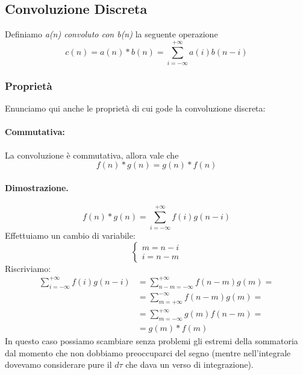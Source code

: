 \subsection{Convoluzione Discreta}
Definiamo \textit{a(n) convoluto con b(n)} la seguente operazione 
\begin{equation}
    c(n) = a(n) \ast b(n) = \sum_{i = -\infty}^{+\infty} a(i)b(n - i)
\end{equation}

\subsubsection{Proprietà}
Enunciamo qui anche le proprietà di cui gode la convoluzione discreta:
\paragraph{Commutativa:} La convoluzione è commutativa, allora vale che
    \begin{equation*}
        f(n) \ast g(n) = g(n) \ast f(n)
    \end{equation*}
    \paragraph{Dimostrazione.}
    \begin{equation*}
        f(n) \ast g(n) = \sum_{i = -\infty}^{+\infty} f(i)g(n - i) 
    \end{equation*}
    Effettuiamo un cambio di variabile: 
    \begin{equation*}
        \begin{cases}
            m = n - i\\
            i = n - m
        \end{cases}
    \end{equation*}
    Riscriviamo:
    \begin{align*}
        \sum_{i = -\infty}^{+\infty} f(i)g(n - i) &= \sum_{n - m = -\infty}^{+\infty} f(n - m)g(m) = \\
                                                  &= \sum_{m = +\infty}^{-\infty} f(n - m)g(m)= \\
                                                  &= \sum_{m = -\infty}^{+\infty} g(m)f(n - m)= \\
                                                  &= g(m) \ast f(m)
    \end{align*}
    In questo caso possiamo scambiare senza problemi gli estremi della sommatoria dal momento che non dobbiamo preoccuparci del segno (mentre
    nell'integrale dovevamo considerare pure il $d\tau$ che dava un verso di integrazione).

